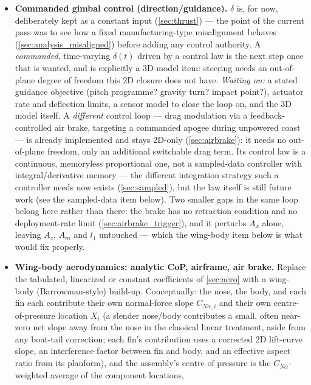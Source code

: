 \documentclass[10pt]{extarticle}
\numberwithin{equation}{subsection}
\begin{document}
\begin{itemize}
    \item \textbf{Commanded gimbal control (direction/guidance).} $\delta$ is, for now, deliberately
    kept as a constant input (\autoref{sec:thrust}) --- the point of the current pass was to see how
    a fixed manufacturing-type misalignment behaves (\autoref{sec:analysis_misaligned}) before
    adding any control authority. A \emph{commanded}, time-varying $\delta(t)$ driven by a control
    law is the next step once that is wanted, and is explicitly a 3D-model item: steering needs an
    out-of-plane degree of freedom this 2D closure does not have. \emph{Waiting on:} a stated
    guidance objective (pitch programme? gravity turn? impact point?), actuator rate and deflection
    limits, a sensor model to close the loop on, and the 3D model itself. A \emph{different} control
    loop --- drag modulation via a feedback-controlled air brake, targeting a commanded apogee
    during unpowered coast --- is already implemented and stays 2D-only (\autoref{sec:airbrake}):
    it needs no out-of-plane freedom, only an additional switchable drag term. Its control law is a
    continuous, memoryless proportional one, not a sampled-data controller with integral/derivative
    memory --- the different integration strategy such a controller needs now exists
    (\autoref{sec:sampled}), but the law itself is still future work (see the sampled-data item
    below). Two smaller gaps in the same loop belong here rather than there: the brake has no
    retraction condition and no deployment-rate limit (\autoref{sec:airbrake_trigger}), and it
    perturbs $A_x$ alone, leaving $A_z$, $A_m$ and $l_1$ untouched --- which the wing-body item
    below is what would fix properly.
    \item \textbf{Wing-body aerodynamics: analytic CoP, airframe, air brake.} Replace the
    tabulated, linearized or constant coefficients of \autoref{sec:aero} with a wing-body
    (Barrowman-style) build-up. Conceptually: the nose, the body, and each fin each contribute
    their own normal-force slope $C_{N\alpha,i}$ and their own centre-of-pressure location
    $X_i$ (a slender
    nose/body contributes a small, often near-zero net slope away from the nose in the classical
    linear treatment, aside from any boat-tail correction; each fin's contribution uses a
    corrected 2D lift-curve slope, an interference factor between fin and body, and an
    effective aspect ratio from its planform), and the assembly's centre of pressure is the
    $C_{N\alpha}$-weighted average of the component locations,

\end{itemize}
\end{document}

